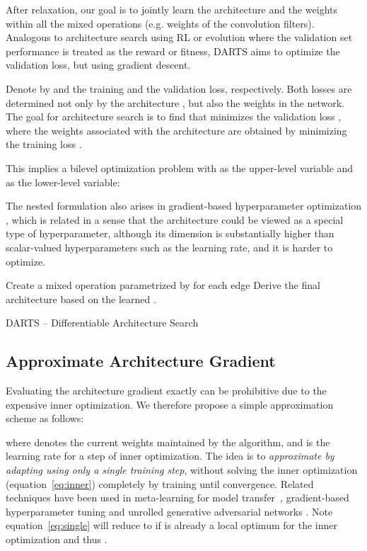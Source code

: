 \documentclass{article}
\def\eqref#1{equation~\ref{#1}}
\begin{document}
After relaxation,
our goal is to jointly learn the architecture 
and the weights  within all the mixed operations (e.g. weights of the convolution filters).
Analogous to architecture search using RL \citep{zoph2016neural, zoph2017learning, pham2018efficient} or evolution \citep{liu2017hierarchical, real2018regularized}
where the validation set performance is treated as the reward or fitness,
DARTS aims to optimize the validation loss, but using gradient descent.

Denote by  and  the training and the validation loss, respectively.
Both losses are determined not only by the architecture , but also the weights  in the network.
The goal for architecture search is to find  that minimizes the validation loss ,
where the weights  associated with the architecture are obtained by minimizing the training loss .

This implies a bilevel optimization problem \citep{anandalingam1992hierarchical, colson2007overview} with  as the upper-level variable and  as the lower-level variable:

The nested formulation also arises in gradient-based hyperparameter optimization \citep{maclaurin2015gradient, pedregosa2016hyperparameter, franceschi2018bilevel}, which is related in a sense that the architecture  could be viewed as a special type of hyperparameter, although its dimension is substantially higher than scalar-valued hyperparameters such as the learning rate, and it is harder to optimize.

\begin{algorithm}[t]
\DontPrintSemicolon
Create a mixed operation  parametrized by  for each edge \;
Derive the final architecture based on the learned .
\caption{{\sc DARTS} -- Differentiable Architecture Search}
\label{algo:pseudocode}
\end{algorithm}

\subsection{Approximate Architecture Gradient}
\label{sec:sec:approximation}
Evaluating the architecture gradient exactly can be prohibitive due to the expensive inner optimization.
We therefore propose a simple approximation scheme as follows:

where  denotes the current weights maintained by the algorithm,
and  is the learning rate for a step of inner optimization.
The idea is to \emph{approximate 
by adapting  using only a single training step}, without solving the inner optimization (\eqref{eq:inner}) completely by training until convergence.
Related techniques have been used in meta-learning for model transfer~\citep{finn2017model}, gradient-based hyperparameter tuning \citep{luketina2016scalable} and unrolled generative adversarial networks \citep{metz2016unrolled}.
Note \eqref{eq:single} will reduce to  if  is already a local optimum for the inner optimization and thus .
\end{document}

